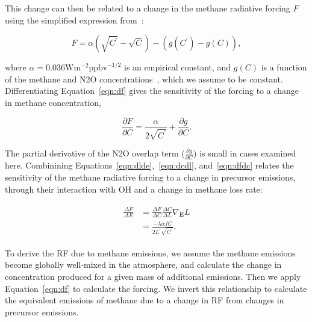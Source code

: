 This change can then be related to a change in the methane radiative forcing $F$ using the simplified expression from~\citet{ref:myhre1998}:

\begin{equation}
F = \alpha (\sqrt{C^{\prime}} - \sqrt{C}) - (g(C^{\prime}) - g(C)),
\label{eqn:df}
\end{equation}

where $\alpha=0.036 \mathrm{W}\mathrm{m}^{-2}\mathrm{ppbv}^{-1/2}$ is an empirical constant, and $g(C)$ is a function of the methane and N2O concentrations~\citep{ref:myhre1998}, which we assume to be constant. Differentiating Equation~\ref{eqn:df} gives the sensitivity of the forcing to a change in methane concentration,

\begin{equation}
\frac{\partial F}{\partial C} = \frac{\alpha}{2\sqrt{C^{\prime}}} + \frac{\partial g}{\partial C}.
\label{eqn:dfdc}
\end{equation}

The partial derivative of the N2O overlap term ($\frac{\partial g}{\partial C}$) is small in cases examined here. Combinining Equations~\ref{eqn:dlde},~\ref{eqn:dcdl}, and~\ref{eqn:dfdc} relates the sensitivity of the methane radiative forcing to a change in precursor emissions, through their interaction with OH and a change in methane loss rate:

\begin{equation}
\begin{align}
\begin{split}
\frac{\Delta F}{\Delta E} &= \frac{\Delta F}{\Delta C} \frac{\Delta C}{\Delta L} \nabla_{\mathbf{E}} L \\
                          &= \frac{-\lambda \alpha f C}{2L^{\prime}\sqrt{C^{\prime}}}.
\end{split}
\label{eqn:dfde}
\end{align}
\end{equation}

To derive the RF due to methane emissions, we assume the methane emissions become globally well-mixed in the atmosphere, and calculate the change in concentration produced for a given mass of additional emissions. Then we apply Equation~\ref{eqn:df} to calculate the forcing. We invert this relationship to calculate the equivalent emissions of methane due to a change in RF from changes in precursor emissions.


